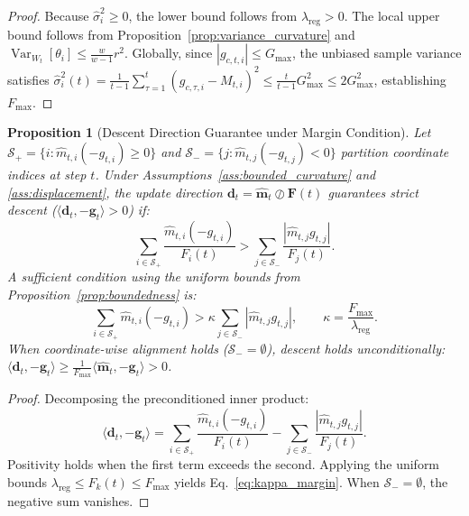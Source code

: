 \documentclass[11pt,a4paper]{article}
\newtheorem{proposition}{Proposition}
\begin{document}
\begin{proof}
Because $\hat{\sigma}_i^2 \ge 0$, the lower bound follows from $\lambda_{\text{reg}} > 0$. The local upper bound follows from Proposition~\ref{prop:variance_curvature} and $\operatorname{Var}_{W_t}[\theta_i] \le \frac{w}{w-1} r^2$. Globally, since $|g_{c,t,i}| \le G_{\max}$, the unbiased sample variance satisfies $\hat{\sigma}_i^2(t) = \frac{1}{t-1}\sum_{\tau=1}^t (g_{c,\tau,i} - M_{t,i})^2 \le \frac{t}{t-1} G_{\max}^2 \le 2 G_{\max}^2$, establishing $F_{\max}$.
\end{proof}

\begin{proposition}[Descent Direction Guarantee under Margin Condition]
\label{prop:descent}
Let $\mathcal{S}_+ = \{i : \hat{m}_{t,i}(-g_{t,i}) \ge 0\}$ and $\mathcal{S}_- = \{j : \hat{m}_{t,j}(-g_{t,j}) < 0\}$ partition coordinate indices at step $t$. Under Assumptions~\ref{ass:bounded_curvature} and \ref{ass:displacement}, the update direction $\mathbf{d}_t = \hat{\mathbf{m}}_t \oslash \mathbf{F}(t)$ guarantees strict descent ($\langle \mathbf{d}_t, -\mathbf{g}_t \rangle > 0$) if:
\begin{equation}
\sum_{i \in \mathcal{S}_+} \frac{\hat{m}_{t,i} (-g_{t,i})}{F_i(t)} > \sum_{j \in \mathcal{S}_-} \frac{|\hat{m}_{t,j} g_{t,j}|}{F_j(t)}.
\label{eq:margin_condition}
\end{equation}
A sufficient condition using the uniform bounds from Proposition~\ref{prop:boundedness} is:
\begin{equation}
\sum_{i \in \mathcal{S}_+} \hat{m}_{t,i} (-g_{t,i}) > \kappa \sum_{j \in \mathcal{S}_-} |\hat{m}_{t,j} g_{t,j}|, \qquad \kappa = \frac{F_{\max}}{\lambda_{\text{reg}}}.
\label{eq:kappa_margin}
\end{equation}
When coordinate-wise alignment holds ($\mathcal{S}_- = \emptyset$), descent holds unconditionally: $\langle \mathbf{d}_t, -\mathbf{g}_t \rangle \ge \frac{1}{F_{\max}} \langle \hat{\mathbf{m}}_t, -\mathbf{g}_t \rangle > 0$.
\end{proposition}

\begin{proof}
Decomposing the preconditioned inner product:
\begin{equation}
\langle \mathbf{d}_t, -\mathbf{g}_t \rangle = \sum_{i \in \mathcal{S}_+} \frac{\hat{m}_{t,i}(-g_{t,i})}{F_i(t)} - \sum_{j \in \mathcal{S}_-} \frac{|\hat{m}_{t,j} g_{t,j}|}{F_j(t)}.
\end{equation}
Positivity holds when the first term exceeds the second. Applying the uniform bounds $\lambda_{\text{reg}} \le F_k(t) \le F_{\max}$ yields Eq.~\eqref{eq:kappa_margin}. When $\mathcal{S}_- = \emptyset$, the negative sum vanishes.
\end{proof}
\end{document}
